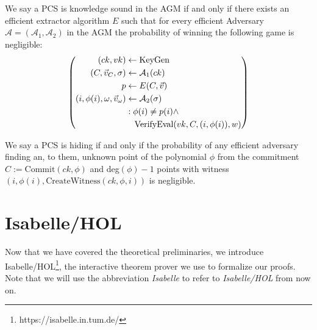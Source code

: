 \begin{definition}
    \label{knowledgesound_def}
    We say a PCS is knowledge sound in the AGM if and only if there exists an efficient extractor algorithm $E$ such that for every efficient Adversary $\mathcal{A}=(\mathcal{A}_1, \mathcal{A}_2)$ in the AGM the probability of winning the following game is negligible: 
    \begin{equation*}
        \left(
            \begin{aligned}
                (ck,vk) & \leftarrow \text{KeyGen} \\
                (C,\vec{v}_C, \sigma) & \leftarrow \mathcal{A}_1(ck)\\
                p & \leftarrow E(C,\vec{v}) \\
                (i, \phi(i), \omega, \vec{v}_{\omega}) &\leftarrow \mathcal{A}_2(\sigma)\\
                & : \phi(i) \ne p(i) \land \\
                & \hspace{3.5mm} \text{VerifyEval}(vk, C,(i,\phi(i)),w)
            \end{aligned}
        \right)
    \end{equation*}
    \parencite{plonk}
\end{definition}

\begin{definition}[hiding]
    \label{hiding_def}
    We say a PCS is hiding if and only if the probability of any efficient adversary finding an, to them, unknown point of the polynomial $\phi$ from the commitment $C:=\text{Commit}(ck,\phi)$ and deg$(\phi)-1$ points with witness  $(i,\phi(i),\text{CreateWitness}(ck, \phi, i))$ is negligible.
    \parencite{KZG}
\end{definition}

\section{Isabelle/HOL}
Now that we have covered the theoretical preliminaries, we introduce Isabelle/HOL\footnote{https://isabelle.in.tum.de/}, the interactive theorem prover we use to formalize our proofs. 
Note that we will use the abbreviation \textit{Isabelle} to refer to \textit{Isabelle/HOL} from now on. 

